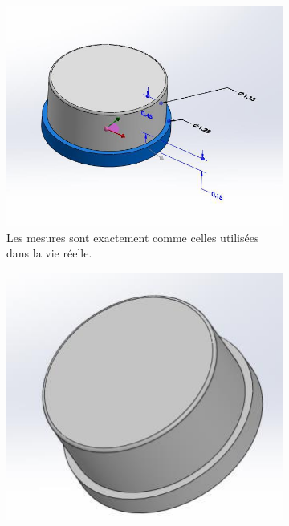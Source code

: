 \begin{figure}
    \begin{subfigure}[m]{.65\linewidth}
        \includegraphics[width=\textwidth]{assets/conception1/img160.jpg}
        \caption{Les mesures sont exactement comme celles utilisées dans la vie réelle.}
    \end{subfigure}
    \hfill
    \begin{subfigure}[m]{.25\linewidth}
        \centering
        \includegraphics[width=\textwidth]{assets/conception1/img159.jpg}

\end{subfigure}
\end{figure}

